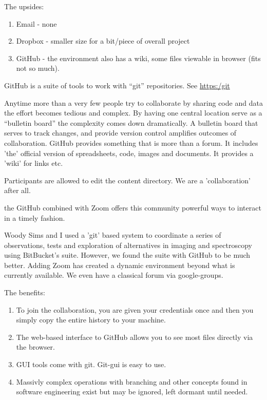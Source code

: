 \documentclass[letter,11pt,oneside]{article}
\begin{document}
The upsides:
\vspace{-.15cm}
\begin{enumerate}\addtolength{\itemsep}{-0.5\baselineskip}
   \item   Email - none
   \item   Dropbox - smaller size for a bit/piece of overall project
   \item   GitHub - the environment also has a wiki, some files viewable
in browser (fits not so much).
\end{enumerate}

GitHub is a suite of tools to work with ``git'' repositories. 
See \url{https:/git}

Anytime more than a very few people try to collaborate by sharing code
and data the effort becomes tedious and complex. By having one central
location serve as a ``bulletin board'' the complexity comes down 
dramatically. A bulletin board that serves to track changes,
and provide version control amplifies outcomes of collaboration.
GitHub provides something that is more than a forum. It includes
'the' official version of spreadsheets, code, images and documents.
It provides a 'wiki' for links etc.

Participants are allowed to edit the content directory. We are
a 'collaboration' after all.

the GitHub combined with Zoom offers this community powerful ways
to interact in a timely fashion. 

Woody Sims and I used a 'git' based system to coordinate a series of
observations, tests and exploration of alternatives in imaging and
spectroscopy using BitBucket's suite. However, we found the suite with
GitHub to be much better. Adding Zoom has created a dynamic environment
beyond what is currently available. We even have a classical forum
via google-groups.

The benefits:

\vspace{-.15cm}
\begin{enumerate}\addtolength{\itemsep}{-0.5\baselineskip}
   \item   To join the collaboration, you are given your credentials once
and then you simply copy the entire history to your machine.
   \item   The web-based interface to GitHub allows you to see most files
directly via the browser. 
   \item   GUI tools come with git. Git-gui is easy to use.
   \item   Massivly complex operations with branching and other concepts found
in software engineering exist but may be ignored, left dormant until 
needed.
\end{enumerate}
\end{document}
